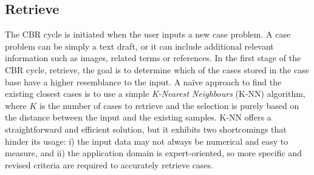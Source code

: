 \subsection*{Retrieve}\label{5_sec:dl_powered_cbr_retrieve}
The CBR cycle is initiated when the user inputs a new case problem. A case problem can be simply a text draft, or it can include additional relevant information such as images, related terms or references. In the first stage of the CBR cycle, retrieve, the goal is to determine which of the cases stored in the case base have a higher resemblance to the input. A naïve approach to find the existing closest cases is to use a simple \textit{K-Nearest Neighbours} (K-NN) algorithm, where $K$ is the number of cases to retrieve and the selection is purely based on the distance between the input and the existing samples. K-NN offers a straightforward and efficient solution, but it exhibits two shortcomings that hinder its usage: i) the input data may not always be numerical and easy to measure, and ii) the application domain is expert-oriented, so more specific and revised criteria are required to accurately retrieve cases.

